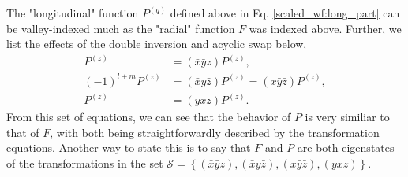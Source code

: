 


The "longitudinal" function $P^{\left(q\right)}$ defined above in Eq.
\eqref{scaled_wf:long_part} can be valley-indexed much as the "radial" function
$F$ was indexed above. Further, we list the effects of the double inversion and
acyclic swap below,
\begin{align}
  P^{\left(z\right)}
  & =
    \left(\bar{x}\bar{y}z\right)P^{\left(z\right)},
  \\
  \left(-1\right)^{l+m}P^{\left(z\right)}
  & =
    \left(\bar{x}y\bar{z}\right)P^{\left(z\right)}
  =
    \left(x\bar{y}\bar{z}\right)P^{\left(z\right)},
  \\
  P^{\left(z\right)}
  & =
    \left(yxz\right)P^{\left(z\right)}.
  \label{azi_def}
\end{align}
From this set of equations, we can see that the behavior of $P$ is very similiar
to that of $F$, with both being straightforwardly described by the
transformation equations. Another way to state this is to say that $F$ and $P$
are both eigenstates of the transformations in the set $\mathcal{S} = \left\{
\left(\bar{x}\bar{y}z\right), \left(\bar{x}y\bar{z}\right),
\left(x\bar{y}\bar{z}\right), \left(yxz\right) \right\}$.

